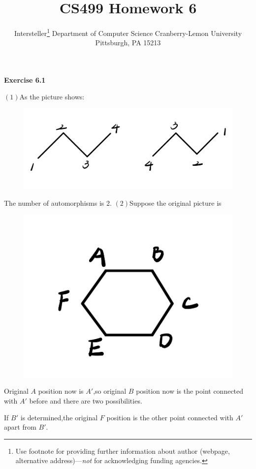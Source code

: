 \documentclass{article} %
\title{CS499 Homework 6}
\author{
	Intersteller\thanks{ Use footnote for providing further information
		about author (webpage, alternative address)---\emph{not} for acknowledging
		funding agencies.}
	Department of Computer Science
	Cranberry-Lemon University
	Pittsburgh, PA 15213
}
\begin{document}
	\maketitle
	\textbf{Exercise 6.1}\par

    $(1)$As the picture shows:\par
    \begin{figure}[H]
		\centering
		\includegraphics[scale=0.3]{p31.jpg}
		\caption{}
		\label{fig:1}
	\end{figure}
	The number of automorphisms is 2.
    $(2)$Suppose the original picture is\par
    \begin{figure}[H]
		\centering
		\includegraphics[scale=0.4]{p32.jpg}
		\caption{}
		\label{fig:2}
	\end{figure}
    Original $A$ position now is $A'$,so original $B$ position now is the point connected with $A'$ before and there are two possibilities.\par
    If $B'$ is determined,the original $F$ position is the other point connected with $A'$ apart from $B'$.\par
\end{document}
